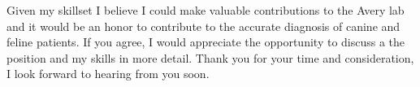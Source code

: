 \documentclass[11pt,a4paper,sans]{moderncv}
\begin{document}
\begin{spacing}{1.1}
Given my skillset I believe I could make valuable contributions to the Avery lab and it would be an honor to contribute to the accurate diagnosis of canine and feline patients. If you agree, I would appreciate the opportunity to discuss a the position and my skills in more detail. Thank you for your time and consideration, I look forward to hearing from you soon.


 

\end{spacing}
\makeletterclosing
\end{document}
